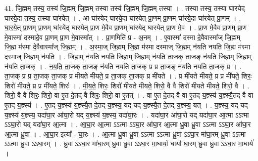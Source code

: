 \documentclass[17pt]{extarticle}
\begin{document}
41. जि॒ह्मम् तस्य॒ तस्य॑ जि॒ह्मम् जि॒ह्मम् तस्या तस्य॑ जि॒ह्मम् जि॒ह्मम् तस्या । . तस्या तस्य॒ तस्या घा॑रयेद् घारये॒दा तस्य॒ तस्या घा॑रयेत् । . आ घा॑रयेद् घारये॒दा घा॑रयेत् प्रा॒णम् प्रा॒णम् घा॑रये॒दा घा॑रयेत् प्रा॒णम् । . घा॒र॒ये॒त् प्रा॒णम् प्रा॒णम् घा॑रयेद् घारयेत् प्रा॒ण मे॒वैव प्रा॒णम् घा॑रयेद् घारयेत् प्रा॒ण मे॒व । . प्रा॒ण मे॒वैव प्रा॒णम् प्रा॒ण मे॒वास्मा॑ दस्मादे॒व प्रा॒णम् प्रा॒ण मे॒वास्मा᳚त् । . प्रा॒णमिति॑ प्र - अ॒नम् । . ए॒वास्मा॑ दस्मा दे॒वैवास्मा᳚ज् जि॒ह्मम् जि॒ह्म म॑स्मा दे॒वैवास्मा᳚ज् जि॒ह्मम् । . अ॒स्मा॒ज् जि॒ह्मम् जि॒ह्म म॑स्मा दस्माज् जि॒ह्मम् न॑यति नयति जि॒ह्म म॑स्मा दस्माज् जि॒ह्मम् न॑यति । . जि॒ह्मम् न॑यति नयति जि॒ह्मम् जि॒ह्मम् न॑यति ता॒जक् ता॒जङ् न॑यति जि॒ह्मम् जि॒ह्मम् न॑यति ता॒जक् । . न॒य॒ति॒ ता॒जक् ता॒जङ् न॑यति नयति ता॒जक् प्र प्र ता॒जङ् न॑यति नयति ता॒जक् प्र । . ता॒जक् प्र प्र ता॒जक् ता॒जक् प्र मी॑यते मीयते॒ प्र ता॒जक् ता॒जक् प्र मी॑यते । . प्र मी॑यते मीयते॒ प्र प्र मी॑यते॒ शिरः॒ शिरो॑ मीयते॒ प्र प्र मी॑यते॒ शिरः॑ । . मी॒य॒ते॒ शिरः॒ शिरो॑ मीयते मीयते॒ शिरो॒ वै वै शिरो॑ मीयते मीयते॒ शिरो॒ वै । . शिरो॒ वै वै शिरः॒ शिरो॒ वा ए॒त दे॒तद् वै शिरः॒ शिरो॒ वा ए॒तत् । . वा ए॒त दे॒तद् वै वा ए॒तद् य॒ज्ञ्स्य॑ य॒ज्ञ्स्यै॒तद् वै वा ए॒तद् य॒ज्ञ्स्य॑ । . ए॒तद् य॒ज्ञ्स्य॑ य॒ज्ञ्स्यै॒त दे॒तद् य॒ज्ञ्स्य॒ यद् यद् य॒ज्ञ्स्यै॒त दे॒तद् य॒ज्ञ्स्य॒ यत् । . य॒ज्ञ्स्य॒ यद् यद् य॒ज्ञ्स्य॑ य॒ज्ञ्स्य॒ यदा॑घा॒र आ॑घा॒रो यद् य॒ज्ञ्स्य॑ य॒ज्ञ्स्य॒ यदा॑घा॒रः । . यदा॑घा॒र आ॑घा॒रो यद् यदा॑घा॒र आ॒त्मा ऽऽत्मा ऽऽघा॒रो यद् यदा॑घा॒र आ॒त्मा । . आ॒घा॒र आ॒त्मा ऽऽत्मा ऽऽघा॒र आ॑घा॒र आ॒त्मा ध्रु॒वा ध्रु॒वा ऽऽत्मा ऽऽघा॒र आ॑घा॒र आ॒त्मा ध्रु॒वा । . आ॒घा॒र इत्या᳚ - घा॒रः । . आ॒त्मा ध्रु॒वा ध्रु॒वा ऽऽत्मा ऽऽत्मा ध्रु॒वा ऽऽघा॒र मा॑घा॒रम् ध्रु॒वा ऽऽत्मा ऽऽत्मा ध्रु॒वा ऽऽघा॒रम् । . ध्रु॒वा ऽऽघा॒र मा॑घा॒रम् ध्रु॒वा ध्रु॒वा ऽऽघा॒र मा॒घार्या॒ घार्या॑ घा॒रम् ध्रु॒वा ध्रु॒वा ऽऽघा॒र मा॒घार्य॑ । \newline
\pagebreak
{}
\end{document}

